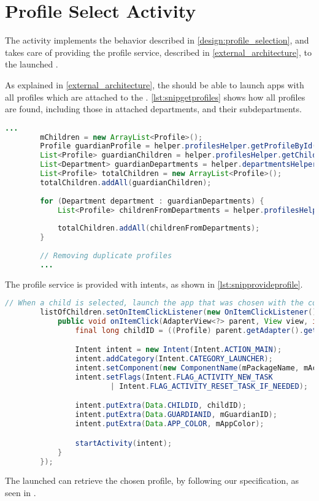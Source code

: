 \section{Profile Select Activity}

The  activity implements the behavior described in \autoref{design:profile_selection}, and takes care of providing the profile service, described in \autoref{external_architecture}, to the launched \girafapp[].

As explained in \autoref{external_architecture}, the \guardian[] should be able to launch apps with all profiles which are attached to the \guardian[]. \autoref{lst:snipgetprofiles} shows how all profiles are found, including those in attached departments, and their subdepartments.

\begin{lstlisting}[style=sourceCode, language=JAVA, caption=Snippet of the \method{loadApplications} method, label=lst:snipgetprofiles]
		...
		mChildren = new ArrayList<Profile>();
		Profile guardianProfile = helper.profilesHelper.getProfileById(mGuardianID);
		List<Profile> guardianChildren = helper.profilesHelper.getChildrenByGuardian(guardianProfile);
		List<Department> guardianDepartments = helper.departmentsHelper.getDepartmentsByProfile(guardianProfile);
		List<Profile> totalChildren = new ArrayList<Profile>();
		totalChildren.addAll(guardianChildren);
		
		for (Department department : guardianDepartments) {
			List<Profile> childrenFromDepartments = helper.profilesHelper.getChildrenByDepartmentAndSubDepartments(department);
			
			totalChildren.addAll(childrenFromDepartments);
		}
		
		// Removing duplicate profiles
		...
\end{lstlisting}

The profile service is provided with intents, as shown in \autoref{lst:snipprovideprofile}.

\begin{lstlisting}[style=sourceCode, language=JAVA, caption=Snippet of the \method{loadApplications} method, label=lst:snipprovideprofile]
		// When a child is selected, launch the app that was chosen with the correct data in the extras.
		listOfChildren.setOnItemClickListener(new OnItemClickListener() {
			public void onItemClick(AdapterView<?> parent, View view, int position, long id) {
				final long childID = ((Profile) parent.getAdapter().getItem(position)).getId();

				Intent intent = new Intent(Intent.ACTION_MAIN);
				intent.addCategory(Intent.CATEGORY_LAUNCHER);
				intent.setComponent(new ComponentName(mPackageName, mActivityName));
				intent.setFlags(Intent.FLAG_ACTIVITY_NEW_TASK
						| Intent.FLAG_ACTIVITY_RESET_TASK_IF_NEEDED);

				intent.putExtra(Data.CHILDID, childID);
				intent.putExtra(Data.GUARDIANID, mGuardianID);
				intent.putExtra(Data.APP_COLOR, mAppColor);

				startActivity(intent);
			}
		});
\end{lstlisting}

The launched \girafapp[] can retrieve the chosen profile, by following our specification, as seen in .